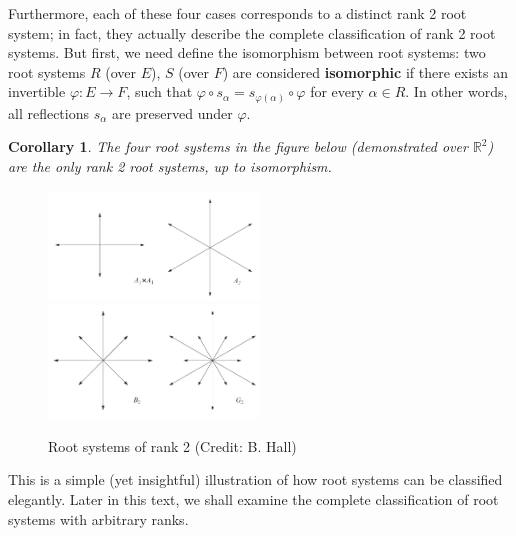 \documentclass{article}
\newtheorem{corollary}{Corollary}[theorem]
\theoremstyle{definition}
\begin{document}
Furthermore, each of these four cases corresponds to a distinct rank 2 root system; in fact, they actually describe the complete classification of rank 2 root systems. But first, we need define the isomorphism between root systems: two root systems $R$ (over $E$), $S$ (over $F$) are considered \textbf{isomorphic} if there exists an invertible $\varphi : E\to F$, such that $\varphi\circ s_\alpha=s_{\varphi(\alpha)}\circ\varphi$ for every $\alpha\in R$. In other words, all reflections $s_\alpha$ are preserved under $\varphi$. 
\begin{corollary}
The four root systems in the figure below (demonstrated over $\mathbb{R}^2$) are the only rank 2 root systems, up to isomorphism. 
\end{corollary}
\begin{figure}[H]
  \includegraphics[width=0.5\textwidth]{top.jpg}
  \includegraphics[width=0.5\textwidth]{bottom.jpg}
  \caption{Root systems of rank 2 (Credit: B. Hall)}
\end{figure}
This is a simple (yet insightful) illustration of how root systems can be classified elegantly. Later in this text, we shall examine the complete classification of root systems with arbitrary ranks. 
\end{document}
